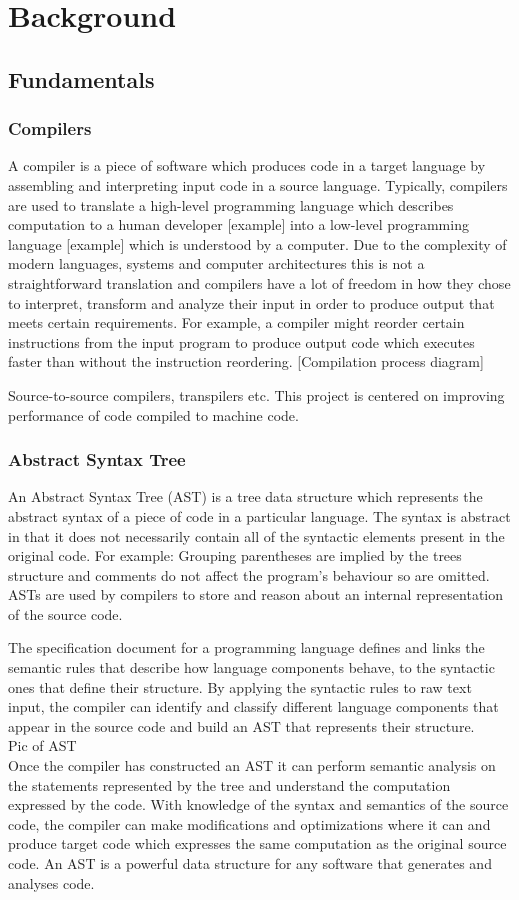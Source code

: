 \documentclass[a4paper,12pt,twoside]{report}
\begin{document}
\chapter{Background}

\section{Fundamentals}
\subsection*{Compilers}
A compiler is a piece of software which produces code in a target language by assembling and interpreting input code in a source language.
Typically, compilers are used to translate a high-level programming language which describes computation to a human developer [example] into 
a low-level programming language [example] which is understood by a computer. Due to the complexity of modern languages, systems and computer
architectures this is not a straightforward translation and compilers have a lot of freedom in how they chose to interpret, transform and analyze
their input in order to produce output that meets certain requirements. For example, a compiler might reorder certain instructions from the input
program to produce output code which executes faster than without the instruction reordering.
[Compilation process diagram]

Source-to-source compilers, transpilers etc. This project is centered on improving performance of code compiled to machine code.

\subsection*{Abstract Syntax Tree}
An Abstract Syntax Tree (AST) is a tree data structure which represents the abstract syntax of a piece of
code in a particular language. The syntax is abstract in that it does not necessarily contain all of the
syntactic elements present in the original code. For example: Grouping parentheses are implied by the
trees structure and comments do not affect the program's behaviour so are omitted. ASTs are used 
by compilers to store and reason about an internal representation of the source code.

The specification document for a programming language defines and links the semantic rules that describe 
how language components behave, to the syntactic ones that define their structure. 
By applying the syntactic rules to raw text input, the compiler can identify and classify different 
language components that appear in the source code and build an AST that represents their structure.
\\
Pic of AST
\\
Once the compiler has constructed an AST it can perform semantic analysis on the statements represented
by the tree and understand the computation expressed by the code. With knowledge of the syntax and 
semantics of the source code, the compiler can make modifications and optimizations where it can and produce 
target code which expresses the same computation as the original source code. An AST is a powerful
data structure for any software that generates and analyses code.
\end{document}
